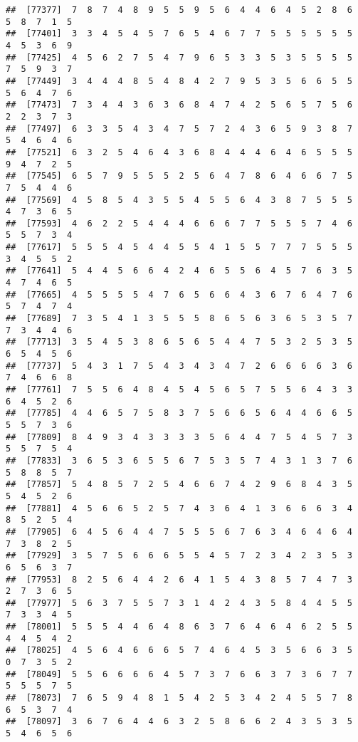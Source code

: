 \documentclass[
]{book}
\begin{document}
\begin{verbatim}
##  [77377]  7  8  7  4  8  9  5  5  9  5  6  4  4  6  4  5  2  8  6  5  8  7  1  5
##  [77401]  3  3  4  5  4  5  7  6  5  4  6  7  7  5  5  5  5  5  5  4  5  3  6  9
##  [77425]  4  5  6  2  7  5  4  7  9  6  5  3  3  5  3  5  5  5  5  7  5  9  3  7
##  [77449]  3  4  4  4  8  5  4  8  4  2  7  9  5  3  5  6  6  5  5  5  6  4  7  6
##  [77473]  7  3  4  4  3  6  3  6  8  4  7  4  2  5  6  5  7  5  6  2  2  3  7  3
##  [77497]  6  3  3  5  4  3  4  7  5  7  2  4  3  6  5  9  3  8  7  5  4  6  4  6
##  [77521]  6  3  2  5  4  6  4  3  6  8  4  4  4  6  4  6  5  5  5  9  4  7  2  5
##  [77545]  6  5  7  9  5  5  5  2  5  6  4  7  8  6  4  6  6  7  5  7  5  4  4  6
##  [77569]  4  5  8  5  4  3  5  5  4  5  5  6  4  3  8  7  5  5  5  4  7  3  6  5
##  [77593]  4  6  2  2  5  4  4  4  6  6  6  7  7  5  5  5  7  4  6  5  5  7  3  4
##  [77617]  5  5  5  4  5  4  4  5  5  4  1  5  5  7  7  7  5  5  5  3  4  5  5  2
##  [77641]  5  4  4  5  6  6  4  2  4  6  5  5  6  4  5  7  6  3  5  4  7  4  6  5
##  [77665]  4  5  5  5  5  4  7  6  5  6  6  4  3  6  7  6  4  7  6  5  7  4  7  4
##  [77689]  7  3  5  4  1  3  5  5  5  8  6  5  6  3  6  5  3  5  7  7  3  4  4  6
##  [77713]  3  5  4  5  3  8  6  5  6  5  4  4  7  5  3  2  5  3  5  6  5  4  5  6
##  [77737]  5  4  3  1  7  5  4  3  4  3  4  7  2  6  6  6  6  3  6  7  4  6  6  8
##  [77761]  7  5  5  6  4  8  4  5  4  5  6  5  7  5  5  6  4  3  3  6  4  5  2  6
##  [77785]  4  4  6  5  7  5  8  3  7  5  6  6  5  6  4  4  6  6  5  5  5  7  3  6
##  [77809]  8  4  9  3  4  3  3  3  3  5  6  4  4  7  5  4  5  7  3  5  5  7  5  4
##  [77833]  3  6  5  3  6  5  5  6  7  5  3  5  7  4  3  1  3  7  6  5  8  8  5  7
##  [77857]  5  4  8  5  7  2  5  4  6  6  7  4  2  9  6  8  4  3  5  5  4  5  2  6
##  [77881]  4  5  6  6  5  2  5  7  4  3  6  4  1  3  6  6  6  3  4  8  5  2  5  4
##  [77905]  6  4  5  6  4  4  7  5  5  5  6  7  6  3  4  6  4  6  4  7  3  8  2  5
##  [77929]  3  5  7  5  6  6  6  5  5  4  5  7  2  3  4  2  3  5  3  6  5  6  3  7
##  [77953]  8  2  5  6  4  4  2  6  4  1  5  4  3  8  5  7  4  7  3  2  7  3  6  5
##  [77977]  5  6  3  7  5  5  7  3  1  4  2  4  3  5  8  4  4  5  5  7  3  3  4  5
##  [78001]  5  5  5  4  4  6  4  8  6  3  7  6  4  6  4  6  2  5  5  4  4  5  4  2
##  [78025]  4  5  6  4  6  6  6  5  7  4  6  4  5  3  5  6  6  3  5  0  7  3  5  2
##  [78049]  5  5  6  6  6  6  4  5  7  3  7  6  6  3  7  3  6  7  7  5  5  5  7  5
##  [78073]  7  6  5  9  4  8  1  5  4  2  5  3  4  2  4  5  5  7  8  6  5  3  7  4
##  [78097]  3  6  7  6  4  4  6  3  2  5  8  6  6  2  4  3  5  3  5  5  4  6  5  6

\end{verbatim}
\end{document}
